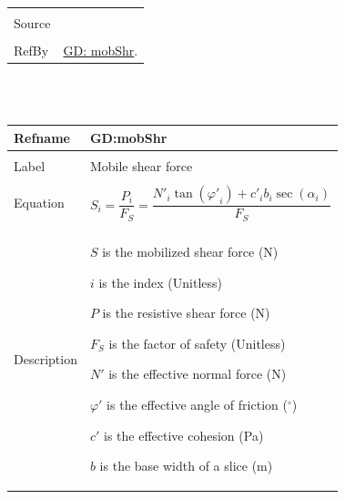 \documentclass[12pt]{article}
\begin{document}
\begin{minipage}{\textwidth}
\begin{tabular}{p{} p{}}
                                         \\ \midrule \\
                                         Source & \cite{chen2005}
                                                  \\ \midrule \\
                                                  RefBy & \hyperref[GD:mobShr]{GD: mobShr}.
\\ \bottomrule \end{tabular}
\end{minipage}\\
~\newline
 \noindent \begin{minipage}{\textwidth}
\begin{tabular}{p{} p{}}
\toprule \textbf{Refname} & \textbf{GD:mobShr}
\label{GD:mobShr}
\\ \midrule \\
Label & Mobile shear force
        \\ \midrule \\
        Equation & \begin{dmath}
                   S_{i}=\frac{P_{i}}{{F_{S}}}=\frac{{N'}_{i} \tan\left({φ'}_{i}\right)+{c'}_{i} b_{i} \sec\left(α_{i}\right)}{{F_{S}}}
                   \end{dmath}
                   \\ \midrule \\
                   Description & \begin{symbDescription}
                                 \item{$S$ is the mobilized shear force (N)}
                                 \item{$i$ is the index (Unitless)}
                                 \item{$P$ is the resistive shear force (N)}
                                 \item{${F_{S}}$ is the factor of safety (Unitless)}
                                 \item{$N'$ is the effective normal force (N)}
                                 \item{$φ'$ is the effective angle of friction (${}^{\circ}$)}
                                 \item{$c'$ is the effective cohesion (Pa)}
                                 \item{$b$ is the base width of a slice (m)}

\end{symbDescription}
\end{tabular}
\end{minipage}
\end{document}
